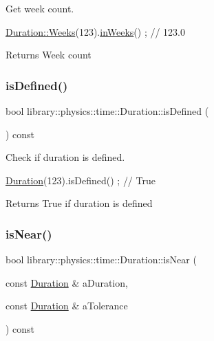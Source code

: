 Get week count. 


\begin{DoxyCode}
\hyperlink{classlibrary_1_1physics_1_1time_1_1_duration_ae9d507f6cbb36902529b28d3721507c1}{Duration::Weeks}(123).\hyperlink{classlibrary_1_1physics_1_1time_1_1_duration_ae49243cf87ccf07693b65e7170642b65}{inWeeks}() ; \textcolor{comment}{// 123.0}
\end{DoxyCode}


\begin{DoxyReturn}{Returns}
Week count 
\end{DoxyReturn}
\mbox{\label{classlibrary_1_1physics_1_1time_1_1_duration_af6ee4c1644a1cafc96d670e576dc6749}} 
\subsubsection{\texorpdfstring{is\+Defined()}{isDefined()}}
{\footnotesize\ttfamily bool library\+::physics\+::time\+::\+Duration\+::is\+Defined (\begin{DoxyParamCaption}{ }\end{DoxyParamCaption}) const}



Check if duration is defined. 


\begin{DoxyCode}
\hyperlink{classlibrary_1_1physics_1_1time_1_1_duration_a0a70efcf487a841da572afcf00001f64}{Duration}(123).isDefined() ; \textcolor{comment}{// True}
\end{DoxyCode}


\begin{DoxyReturn}{Returns}
True if duration is defined 
\end{DoxyReturn}
\mbox{\label{classlibrary_1_1physics_1_1time_1_1_duration_a7df03d520e9372f58c37309e8ac8e08d}} 
\subsubsection{\texorpdfstring{is\+Near()}{isNear()}}
{\footnotesize\ttfamily bool library\+::physics\+::time\+::\+Duration\+::is\+Near (\begin{DoxyParamCaption}\item[{const \hyperlink{classlibrary_1_1physics_1_1time_1_1_duration}{Duration} \&}]{a\+Duration,  }\item[{const \hyperlink{classlibrary_1_1physics_1_1time_1_1_duration}{Duration} \&}]{a\+Tolerance }\end{DoxyParamCaption}) const}



